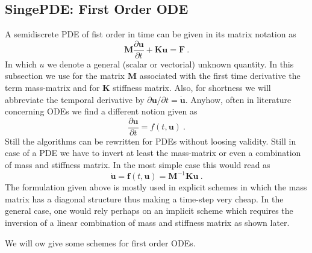 \subsection{SingePDE: First Order ODE}
A semidiscrete PDE of fist order in time can be given in its matrix notation as
\begin{equation}
\mathbf{M} \frac{\partial \mathbf{u}}{\partial t} + \mathbf{K} \mathbf{u} = \mathbf{F}\ .
\end{equation}
In which $u$ we denote a general (scalar or vectorial) unknown quantity. In this subsection we use for
the matrix $\mathbf{M}$ associated with the first time derivative the term mass-matrix and for $\mathbf{K}$
stiffness matrix. Also, for shortness we will
abbreviate the temporal derivative by $\partial \mathbf{u} / \partial t = \dot{\mathbf{u}}$.
Anyhow, often in literature concerning ODEs we find a different notion given as
\begin{equation}
\frac{\partial \mathbf{u}}{\partial t} = f(t,\mathbf{u})\ .
\end{equation}
Still the algorithms can be rewritten for PDEs without loosing validity. Still in case of a PDE we
have to invert at least the mass-matrix or even a combination of mass and stiffness matrix.
In the most simple case this would read as
\begin{equation}
\dot{\mathbf{u}} = \mathbf{f}(t,\mathbf{u}) = \mathbf{M}^{-1} \mathbf{K} \mathbf{u} \ .
\end{equation}
The formulation given above is mostly used in explicit schemes in which the mass matrix has a
diagonal structure thus making a time-step very cheap. In the general case, one would rely perhaps on
an implicit scheme which requires the inversion of a linear combination of mass and stiffness matrix as
shown later.

We will ow give some schemes for first order ODEs.
